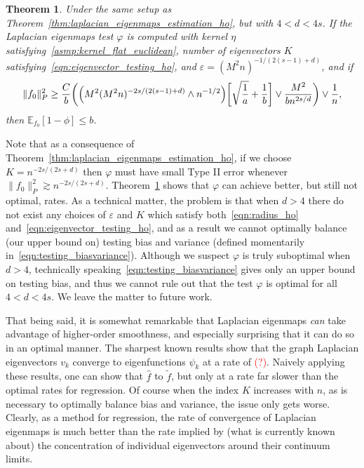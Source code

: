 \documentclass{article}
\newcommand{\1}{\mathbf{1}}
\newcommand{\Ebb}{\mathbb{E}}
\newcommand{\wt}[1]{\widetilde{#1}}
\newcommand{\wh}[1]{\widehat{#1}}
\theoremstyle{alden}
\theoremstyle{aldenthm}
\newtheorem{theorem}{Theorem}
\theoremstyle{definition}
\theoremstyle{remark}
\begin{document}
\begin{theorem}
	\label{thm:laplacian_eigenmaps_testing_ho_suboptimal}
	Under the same setup as Theorem~\ref{thm:laplacian_eigenmaps_estimation_ho}, but with $4 < d < 4s$. If the Laplacian eigenmaps test $\varphi$ is computed with kernel $\eta$ satisfying~\ref{asmp:kernel_flat_euclidean}, number of eigenvectors $K$ satisfying~\eqref{eqn:eigenvector_testing_ho}, and $\varepsilon = (M^2n)^{-1/(2(s - 1) + d)}$, and if 
	\begin{equation}
	\label{eqn:laplacian_eigenmaps_testing_criticalradius_ho_suboptimal}
	\|f_0\|_P^2 \geq \frac{C}{b}\biggl(\Bigl(M^2(M^2n)^{-2s/(2(s - 1) + d) } \wedge n^{-1/2}\Bigr)\biggl[\sqrt{\frac{1}{a}} + \frac{1}{b}\biggr] \vee \frac{M^2}{b n^{2s/d}} \biggr) \vee \frac{1}{n},
	\end{equation}
	then $\Ebb_{f_0}[1 - \phi] \leq b$.
\end{theorem}
Note that as a consequence of Theorem~\ref{thm:laplacian_eigenmaps_estimation_ho}, if we choose $K = n^{-2s/(2s + d)}$ then $\varphi$ must have small Type II error whenever $\|f_0\|_P^2 \gtrsim n^{-2s/(2s + d)}$. Theorem~\ref{thm:laplacian_eigenmaps_testing_ho_suboptimal} shows that $\varphi$ can achieve better, but still not optimal, rates. As a technical matter, the problem is that when $d > 4$ there do not exist any choices of $\varepsilon$ and $K$ which satisfy both~\eqref{eqn:radius_ho} and~\eqref{eqn:eigenvector_testing_ho}, and as a result we cannot optimally balance (our upper bound on) testing bias and variance (defined momentarily in~\eqref{eqn:testing_biasvariance}). Although we suspect $\varphi$ is truly suboptimal when $d > 4$, technically speaking~\eqref{eqn:testing_biasvariance} gives only an upper bound on testing bias, and thus we cannot rule out that the test $\varphi$ is optimal for all $4 < d < 4s$. We leave the matter to future work.

That being said, it is somewhat remarkable that Laplacian eigenmaps \emph{can} take advantage of higher-order smoothness, and especially surprising that it can do so in an optimal manner. The sharpest known results show that the graph Laplacian eigenvectors $v_k$ converge to eigenfunctions $\psi_k$ at a rate of \textcolor{red}{(?)}. Naively applying these results, one can show that $\wh{f}$ to $\wt{f}$, but only at a rate far slower than the optimal rates for regression. Of course when the index $K$ increases with $n$, as is necessary to optimally balance bias and variance, the issue only gets worse. Clearly, as a method for regression, the rate of convergence of Laplacian eigenmaps is much better than the rate implied by (what is currently known about) the concentration of individual eigenvectors around their continuum limits.
\end{document}
